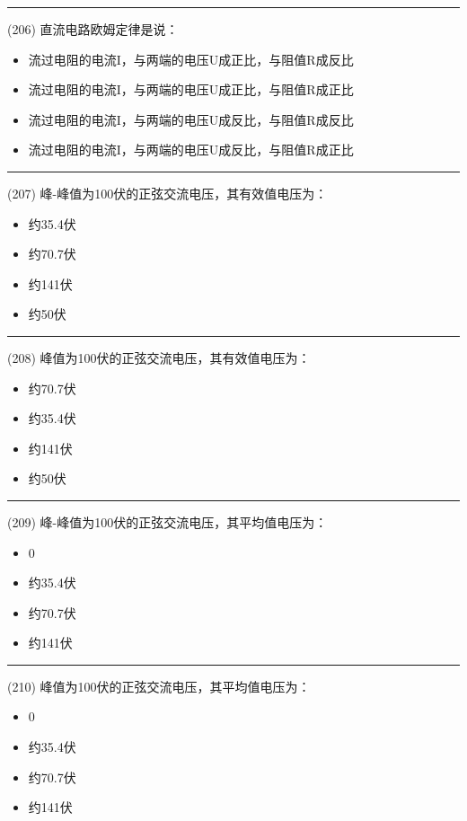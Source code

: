\documentclass[twocolumn]{ctexart}  %
\begin{document}
\noindent\rule{0.5\textwidth}{1pt}
\heiti (206) 直流电路欧姆定律是说： \songti {\color{gray} [LK0440] }
\begin{itemize}
	\item  流过电阻的电流I，与两端的电压U成正比，与阻值R成反比
	\item  流过电阻的电流I，与两端的电压U成正比，与阻值R成正比
	\item  流过电阻的电流I，与两端的电压U成反比，与阻值R成反比
	\item  流过电阻的电流I，与两端的电压U成反比，与阻值R成正比
\end{itemize}


\noindent\rule{0.5\textwidth}{1pt}
\heiti (207) 峰-峰值为100伏的正弦交流电压，其有效值电压为： \songti {\color{gray} [LK0512] }
\begin{itemize}
	\item  约35.4伏
	\item  约70.7伏
	\item  约141伏
	\item  约50伏
\end{itemize}


\noindent\rule{0.5\textwidth}{1pt}
\heiti (208) 峰值为100伏的正弦交流电压，其有效值电压为： \songti {\color{gray} [LK0513] }
\begin{itemize}
	\item  约70.7伏
	\item  约35.4伏
	\item  约141伏
	\item  约50伏
\end{itemize}


\noindent\rule{0.5\textwidth}{1pt}
\heiti (209) 峰-峰值为100伏的正弦交流电压，其平均值电压为： \songti {\color{gray} [LK0518] }
\begin{itemize}
	\item  0
	\item  约35.4伏
	\item  约70.7伏
	\item  约141伏
\end{itemize}


\noindent\rule{0.5\textwidth}{1pt}
\heiti (210) 峰值为100伏的正弦交流电压，其平均值电压为： \songti {\color{gray} [LK0519] }
\begin{itemize}
	\item  0
	\item  约35.4伏
	\item  约70.7伏
	\item  约141伏
\end{itemize}
\end{document}
